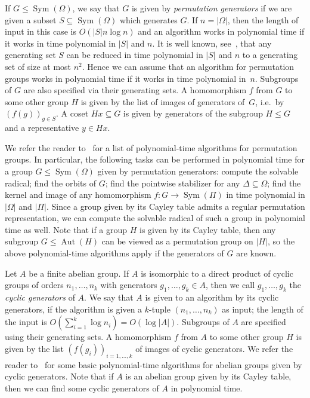 \documentclass{article}
\DeclareMathOperator{\Sym}{Sym}
\DeclareMathOperator{\Aut}{Aut}
\begin{document}
If \( G \leq \Sym(\Omega) \), we say that \( G \) is given by \emph{permutation generators}
if we are given a subset \( S \subseteq \Sym(\Omega) \) which generates \( G \). If \( n = |\Omega| \),
then the length of input in this case is \( O(|S|n \log n) \) and an algorithm works in polynomial time
if it works in time polynomial in \( |S| \) and \( n \). It is well known, see~\cite[Exercise~4.1]{seress},
that any generating set \( S \) can be reduced in time polynomial in \( |S| \) and \( n \) to a generating set of size at most \( n^2 \).
Hence we can assume that an algorithm for permutation groups works in polynomial time if it works in time polynomial in~\( n \).
Subgroups of \( G \) are also specified via their generating sets. A homomorphism \( f \) from \( G \) to some other group \( H \)
is given by the list of images of generators of~\( G \), i.e.\ by \( (f(g))_{g \in S} \).
A coset \( Hx \subseteq G \) is given by generators of the subgroup \( H \leq G \) and a representative \( y \in Hx \).

We refer the reader to~\cite[Subsection~3.1]{seress} for a list of polynomial-time algorithms for permutation groups.
In particular, the following tasks can be performed in polynomial time for a group \( G \leq \Sym(\Omega) \) given by permutation generators:
compute the solvable radical; find the orbits of \( G \); find the pointwise stabilizer for any \( \Delta \subseteq \Omega \);
find the kernel and image of any homomorphism \( f : G \to \Sym(\Pi) \) in time polynomial in \( |\Omega| \) and \( |\Pi| \).
Since a group given by its Cayley table admits a regular permutation representation, we can compute the solvable radical
of such a group in polynomial time as well. Note that if a group \( H \) is given by its Cayley table, then any subgroup \( G \leq \Aut(H) \)
can be viewed as a permutation group on \( |H| \), so the above polynomial-time algorithms apply if the generators of \( G \) are known.

Let \( A \) be a finite abelian group. If \( A \) is isomorphic to a direct product of cyclic groups
of orders \( n_1, \dots, n_k \) with generators \( g_1, \dots, g_k \in A \), then we call \( g_1, \dots, g_k \) the \emph{cyclic generators} of \( A \).
We say that \( A \) is given to an algorithm by its cyclic generators, if the algorithm is given a \( k \)-tuple \( (n_1, \dots, n_k) \) as input;
the length of the input is \( O(\sum_{i=1}^k \log n_i) = O(\log |A|) \). Subgroups of \( A \) are specified using their generating sets.
A homomorphism \( f \) from \( A \) to some other group \( H \) is given by the list \( (f(g_i))_{i=1,\dots,k} \) of images of cyclic generators.
We refer the reader to~\cite[Chapter~2]{iuliana-thesis} for some basic polynomial-time algorithms for abelian groups given by cyclic generators.
Note that if \( A \) is an abelian group given by its Cayley table, then we can find some cyclic generators of \( A \) in polynomial time.
\end{document}
